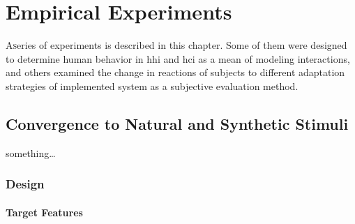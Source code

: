 \chapter{Empirical Experiments}
\label{chap:empirical_experiments}

\lettrine{A} series of experiments is described in this chapter.
Some of them were designed to determine human behavior in \acl{hhi} and \ac{hci} as a mean of modeling interactions, and others examined the change in reactions of subjects to different adaptation strategies of implemented system as a subjective evaluation method.

\pagebreak

\section{Convergence to Natural and Synthetic Stimuli}
\label{sec:convergence_to_natural_and_synthetic_stimuli}

something\ldots

\subsection{Design}
\label{subsec:design_HCIConv}

\subsubsection{Target Features}
\label{subsec:target_features_HCIConv}


